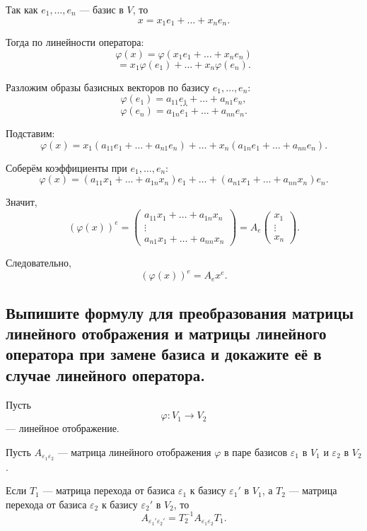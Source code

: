 \begin{Proof}
    Так как $e_1,\ldots,e_n$ --- базис в $V$, то
    \[
        x = x_1e_1 + \ldots + x_ne_n.
    \]
    
    Тогда по линейности оператора:
    \[
        \varphi(x)
        =
        \varphi(x_1e_1 + \ldots + x_ne_n)
    \]
    \[
        =
        x_1\varphi(e_1) + \ldots + x_n\varphi(e_n).
    \]
    
    Разложим образы базисных векторов по базису $e_1,\ldots,e_n$:
    \[
        \varphi(e_1) = a_{11}e_1 + \ldots + a_{n1}e_n,
    \]
    \[
        \ldots
    \]
    \[
        \varphi(e_n) = a_{1n}e_1 + \ldots + a_{nn}e_n.
    \]
    
    Подставим:
    \[
        \varphi(x)
        =
        x_1(a_{11}e_1 + \ldots + a_{n1}e_n)
        + \ldots +
        x_n(a_{1n}e_1 + \ldots + a_{nn}e_n).
    \]
    
    Соберём коэффициенты при $e_1,\ldots,e_n$:
    \[
        \varphi(x)
        =
        (a_{11}x_1 + \ldots + a_{1n}x_n)e_1
        + \ldots +
        (a_{n1}x_1 + \ldots + a_{nn}x_n)e_n.
    \]
    
    Значит,
    \[
        (\varphi(x))^e
        =
        \begin{pmatrix}
            a_{11}x_1 + \ldots + a_{1n}x_n \\
            \vdots \\
            a_{n1}x_1 + \ldots + a_{nn}x_n
        \end{pmatrix}
        =
        A_e
        \begin{pmatrix}
            x_1 \\
            \vdots \\
            x_n
        \end{pmatrix}.
    \]
    
    Следовательно,
    \[
        (\varphi(x))^e = A_e x^e.
    \]
\end{Proof}
\subsection{Выпишите формулу для преобразования матрицы линейного отображения и матрицы линейного оператора при замене базиса и докажите её в случае линейного оператора.}

\begin{theorem}
    Пусть
    \[
        \varphi: V_1 \to V_2
    \]
    --- линейное отображение.
    
    Пусть $A_{\varepsilon_1\varepsilon_2}$ --- матрица линейного отображения $\varphi$ в паре базисов
    $\varepsilon_1$ в $V_1$ и $\varepsilon_2$ в $V_2$.
    
    Если $T_1$ --- матрица перехода от базиса $\varepsilon_1$ к базису $\varepsilon_1'$ в $V_1$,
    а $T_2$ --- матрица перехода от базиса $\varepsilon_2$ к базису $\varepsilon_2'$ в $V_2$, то
    \[
        A_{\varepsilon_1'\varepsilon_2'}
        =
        T_2^{-1}A_{\varepsilon_1\varepsilon_2}T_1.
    \]
\end{theorem}

